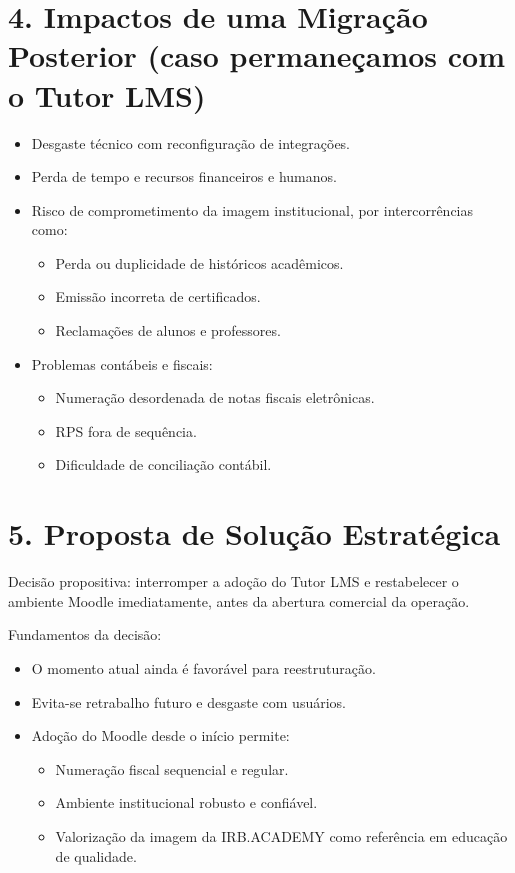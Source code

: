 \documentclass[12pt, a4paper]{letter} %
\begin{document}
\section{4. Impactos de uma Migração Posterior (caso permaneçamos com o Tutor LMS)}
\begin{itemize}
	\item Desgaste técnico com reconfiguração de integrações.
	\item Perda de tempo e recursos financeiros e humanos.
	\item Risco de comprometimento da imagem institucional, por intercorrências como:
	      \begin{itemize}
		      \item Perda ou duplicidade de históricos acadêmicos.
		      \item Emissão incorreta de certificados.
		      \item Reclamações de alunos e professores.
	      \end{itemize}
	\item Problemas contábeis e fiscais:
	      \begin{itemize}
		      \item Numeração desordenada de notas fiscais eletrônicas.
		      \item RPS fora de sequência.
		      \item Dificuldade de conciliação contábil.
	      \end{itemize}
\end{itemize}

\section{5. Proposta de Solução Estratégica}
Decisão propositiva: interromper a adoção do Tutor LMS e restabelecer o ambiente Moodle imediatamente, antes da abertura comercial da operação.

Fundamentos da decisão:
\begin{itemize}
	\item O momento atual ainda é favorável para reestruturação.
	\item Evita-se retrabalho futuro e desgaste com usuários.
	\item Adoção do Moodle desde o início permite:
	      \begin{itemize}
		      \item Numeração fiscal sequencial e regular.
		      \item Ambiente institucional robusto e confiável.
		      \item Valorização da imagem da IRB.ACADEMY como referência em educação de qualidade.
	      \end{itemize}
\end{itemize}
\end{document}
